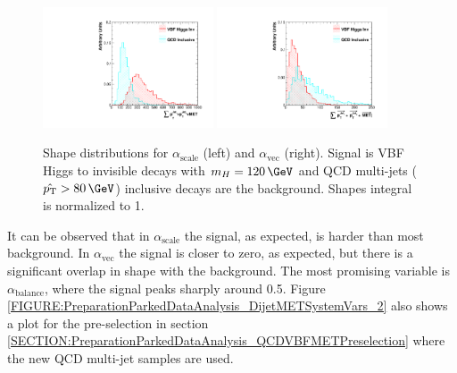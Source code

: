 \begin{figure}[!htb]
\centering
\includegraphics[width=0.45\textwidth]{Chapter06/TopologicalVariables/Images/JetPair_scalSumTriObjectPt.pdf} 
\includegraphics[width=0.45\textwidth]{Chapter06/TopologicalVariables/Images/JetPair_vecSumTriObjectPt.pdf}
\caption[Shape distributions for $\alpha_{\text{scale}}$ and $\alpha_{\text{vec}}$.]
{Shape distributions for $\alpha_{\text{scale}}$ (left) and $\alpha_{\text{vec}}$ (right). Signal is \gls{VBF} Higgs to invisible decays with $m_H=120\,\GeV$ and \gls{QCD} multi-jets ($\hat{\pt}>80\,\GeV$) inclusive decays are the background. Shapes integral is normalized to 1.}
\label{FIGURE:PreparationParkedDataAnalysis_DijetMETSystemVars_1}
\end{figure}

It can be observed that in $\alpha_{\text{scale}}$ the signal, as expected, is harder than most background. In $\alpha_{\text{vec}}$ the signal is closer to zero, as expected, but there is a significant overlap in shape with the background. The most promising variable is $\alpha_{\text{balance}}$, where the signal peaks sharply around 0.5. Figure \ref{FIGURE:PreparationParkedDataAnalysis_DijetMETSystemVars_2} also shows a plot for the pre-selection in section \ref{SECTION:PreparationParkedDataAnalysis_QCDVBFMETPreselection} where the new \gls{QCD} multi-jet samples are used. 

